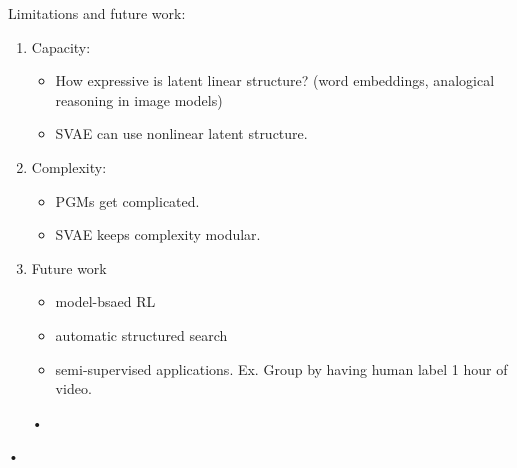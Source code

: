 Limitations and future work:
\begin{enumerate}
\item
Capacity:
\begin{itemize}
\item
How expressive is latent linear structure? (word embeddings, analogical reasoning in image models)
\item
SVAE can use nonlinear latent structure.
\end{itemize}
\item
Complexity:
\begin{itemize}
\item
PGMs get complicated.
\item
SVAE keeps complexity modular.
\end{itemize}
\item
Future work
\begin{itemize}
\item
model-bsaed RL
\item
automatic structured search
\item
semi-supervised applications. Ex. Group by having human label 1 hour of video.
\end{itemize}•
\end{enumerate}•
%